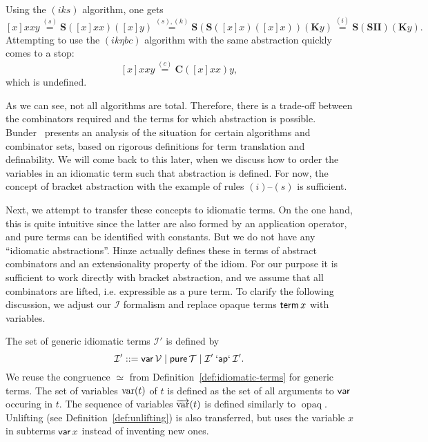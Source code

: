 \begin{example}\label{exmp:bracket-abs}
Using the $(iks)$ algorithm, one gets
\[ [x]xxy \stackrel{(s)}{=} \mathbf{S}([x]xx)([x]y)
	\stackrel{(s),(k)}{=} \mathbf{S}(\mathbf{S}([x]x)([x]x))(\mathbf{K}y)
	\stackrel{(i)}{=} \mathbf{S}(\mathbf{SII})(\mathbf{K}y). \]
Attempting to use the $(ik\eta bc)$ algorithm with the same abstraction
quickly comes to a stop:
\[ [x]xxy \stackrel{(c)}{=} \mathbf{C}([x]xx)y, \]
which is undefined.
\end{example}

As we can see, not all algorithms are total.
Therefore, there is a trade-off between the combinators required and the terms
for which abstraction is possible.
Bunder~\cite{bunder96} presents an analysis of the situation for certain
algorithms and combinator sets, based on rigorous definitions for term
translation and definability.
We will come back to this later, when we discuss how to order the variables in
an idiomatic term such that abstraction is defined.
For now, the concept of bracket abstraction with the example of rules
$(i)$--$(s)$ is sufficient.

Next, we attempt to transfer these concepts to idiomatic terms.
On the one hand, this is quite intuitive since the latter are also formed by
an application operator, and pure terms can be identified with constants.
But we do not have any ``idiomatic abstractions''.
Hinze actually defines these in terms of abstract combinators and an
extensionality property of the idiom.
For our purpose it is sufficient to work directly with bracket abstraction,
and we assume that all combinators are lifted, i.e. expressible as a pure term.
To clarify the following discussion, we adjust our $\mathcal{I}$ formalism
and replace opaque terms $\operatorname{\mathsf{term}} x$ with variables.

\begin{definition}
The set of generic idiomatic terms $\mathcal{I}'$ is defined by
\begin{equation}
	\mathcal{I}' ::= \operatorname{\mathsf{var}} \mathcal{V} \mid \operatorname{\mathsf{pure}} \mathcal{T} \mid
		\mathcal{I}' \mathbin{\mathsf{`ap`}} \mathcal{I}'.
\end{equation}
We reuse the congruence $\simeq$ from Definition~\ref{def:idiomatic-terms} for
generic terms.
The set of variables $\operatorname{var}(t)$ of $t$ is defined as the set of all arguments
to $\operatorname{\mathsf{var}}$ occuring in $t$.
The sequence of variables $\overrightarrow{\operatorname{var}}(t)$ is defined similarly to $\operatorname{opaq}$.
Unlifting (see Definition~\ref{def:unlifting}) is also transferred, but uses
the variable $x$ in subterms $\operatorname{\mathsf{var}} x$ instead of inventing new ones.
\end{definition}

